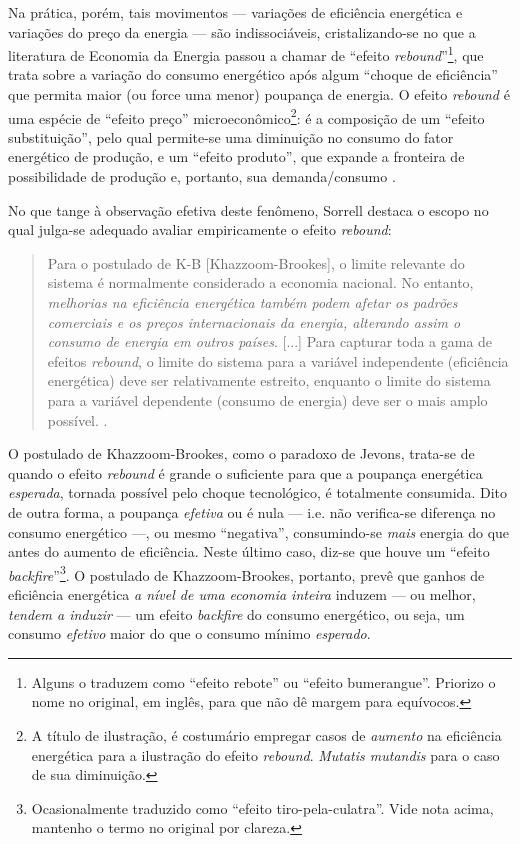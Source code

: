 Na prática, porém, tais movimentos --- variações de eficiência energética e variações do preço da energia --- são indissociáveis, cristalizando-se no que a literatura de Economia da Energia passou a chamar de ``efeito \textit{rebound}''\footnote{Alguns o traduzem como ``efeito rebote'' ou ``efeito bumerangue''. Priorizo o nome no original, em inglês, para que não dê margem para equívocos.}, que trata sobre a variação do consumo energético após algum ``choque de eficiência'' que permita maior (ou force uma menor) poupança de energia. O efeito \textit{rebound} é uma espécie de ``efeito preço'' microeconômico\footnote{A título de ilustração, é costumário empregar casos de \textit{aumento} na eficiência energética para a ilustração do efeito \textit{rebound}. \textit{Mutatis mutandis} para o caso de sua diminuição.}: é a composição de um ``efeito substituição'', pelo qual permite-se uma diminuição no consumo do fator energético de produção, e um ``efeito produto'', que expande a fronteira de possibilidade de produção e, portanto, sua demanda/consumo \cite[p. 174]{Saunders2009}.

No que tange à observação efetiva deste fenômeno, Sorrell destaca o escopo no qual julga-se adequado avaliar empiricamente o efeito \textit{rebound}: 

\begin{quote}
    Para o postulado de K-B [Khazzoom-Brookes], o limite relevante do sistema é normalmente considerado a economia nacional. No entanto, \textit{melhorias na eficiência energética também podem afetar os padrões comerciais e os preços internacionais da energia, alterando assim o consumo de energia em outros países}. [...] Para capturar toda a gama de efeitos \textit{rebound}, o limite do sistema para a variável independente (eficiência energética) deve ser relativamente estreito, enquanto o limite do sistema para a variável dependente (consumo de energia) deve ser o mais amplo possível. \cite[p. 15, grifo meu]{Sorrell2007}.
\end{quote}

O postulado de Khazzoom-Brookes, como o paradoxo de Jevons, trata-se de quando o efeito \textit{rebound} é grande o suficiente para que a poupança energética \textit{esperada}, tornada possível pelo choque tecnológico, é totalmente consumida. Dito de outra forma, a poupança \textit{efetiva} ou é nula --- i.e. não verifica-se diferença no consumo energético ---, ou mesmo ``negativa'', consumindo-se \textit{mais} energia do que antes do aumento de eficiência. Neste último caso, diz-se que houve um ``efeito \textit{backfire}''\footnote{Ocasionalmente traduzido como ``efeito tiro-pela-culatra''. Vide nota acima, mantenho o termo no original por clareza.}. O postulado de Khazzoom-Brookes, portanto, prevê que ganhos de eficiência energética \textit{a nível de uma economia inteira} induzem --- ou melhor, \textit{tendem a induzir} --- um efeito \textit{backfire} do consumo energético, ou seja, um consumo \textit{efetivo} maior do que o consumo mínimo \textit{esperado}. 

